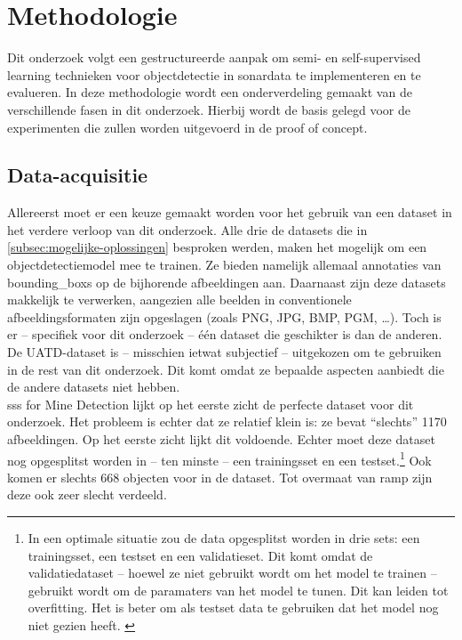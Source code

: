 
\chapter{Methodologie}%
\label{ch:methodologie}

Dit onderzoek volgt een gestructureerde aanpak om semi- en self-supervised learning technieken voor objectdetectie in sonardata te implementeren en te evalueren. In deze methodologie wordt een onderverdeling gemaakt van de verschillende fasen in dit onderzoek. Hierbij wordt de basis gelegd voor de experimenten die zullen worden uitgevoerd in de proof of concept.

\section{Data-acquisitie}

Allereerst moet er een keuze gemaakt worden voor het gebruik van een dataset in het verdere verloop van dit onderzoek. Alle drie de datasets die in \ref{subsec:mogelijke-oplossingen} besproken werden, maken het mogelijk om een objectdetectiemodel mee te trainen. Ze bieden namelijk allemaal annotaties van \glspl{bounding_box} op de bijhorende afbeeldingen aan. Daarnaast zijn deze datasets makkelijk te verwerken, aangezien alle beelden in conventionele afbeeldingsformaten zijn opgeslagen (zoals PNG, JPG, BMP, PGM, \dots). Toch is er -- specifiek voor dit onderzoek -- één dataset die geschikter is dan de anderen. De UATD-dataset is -- misschien ietwat subjectief -- uitgekozen om te gebruiken in de rest van dit onderzoek. Dit komt omdat ze bepaalde aspecten aanbiedt die de andere datasets niet hebben. \\

\gls{sss} for Mine Detection lijkt op het eerste zicht de perfecte dataset voor dit onderzoek. Het probleem is echter dat ze relatief klein is: ze bevat ``slechts'' 1170 afbeeldingen. Op het eerste zicht lijkt dit voldoende. Echter moet deze dataset nog opgesplitst worden in -- ten minste -- een trainingsset en een testset.\footnote{In een optimale situatie zou de data opgesplitst worden in drie sets: een trainingsset, een testset en een validatieset. Dit komt omdat de validatiedataset -- hoewel ze niet gebruikt wordt om het model te trainen -- gebruikt wordt om de paramaters van het model te tunen. Dit kan leiden tot \gls{overfitting}. Het is beter om als testset data te gebruiken dat het model nog niet gezien heeft. \autocite{Goodfellow_2016}} Ook komen er slechts 668 objecten voor in de dataset. Tot overmaat van ramp zijn deze ook zeer slecht verdeeld. 


